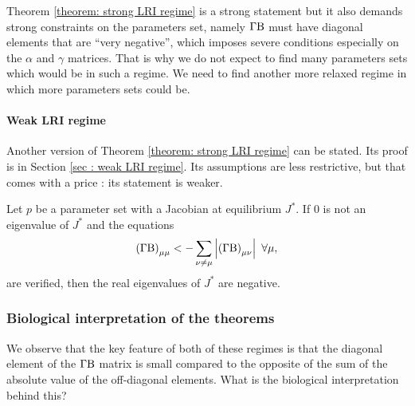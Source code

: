\documentclass[12pt, titlepage]{report}
\begin{document}
\noindent Theorem \ref{theorem: strong LRI regime} is a strong statement but it also demands strong constraints on the parameters set, namely $\Gamma\text{B}$ must have diagonal elements that are ``very negative'', which imposes severe conditions especially on the $\alpha$ and $\gamma$ matrices. That is why we do not expect to find many parameters sets which would be in such a regime. We need to find another more relaxed regime in which more parameters sets could be.
\paragraph{Weak LRI regime}
Another version of Theorem \ref{theorem: strong LRI regime} can be stated. Its proof is in Section \ref{sec : weak LRI regime}. Its assumptions are less restrictive, but that comes with a price : its statement is weaker.
\begin{theorem}\label{theorem: weak LRI regime}
Let $p$ be a parameter set with a Jacobian at equilibrium $J^*$. If $0$ is not an eigenvalue of $J^*$ and the equations
\begin{equation}
\left(\Gamma \text{B}\right)_{\mu\mu} < - \sum_{\nu \neq \mu } \left|{\left(\Gamma \text{B}\right)_{\mu \nu}}\right| \ \forall \mu,
\end{equation}
are verified, then the real eigenvalues of $J^*$ are negative.
\end{theorem}

\subsubsection{Biological interpretation of the theorems}
We observe that the key feature of both of these regimes is that the diagonal element of the $\Gamma\text{B}$ matrix is small compared to the opposite of the sum of the absolute value of the off-diagonal elements. What is the biological interpretation behind this?
\end{document}
